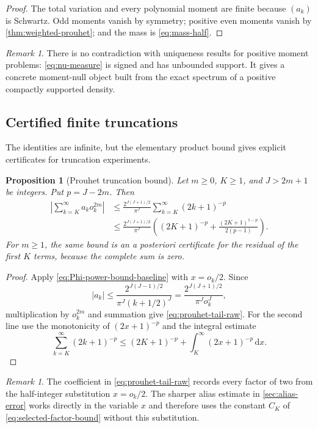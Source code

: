 \documentclass[11pt,oneside]{article}
\newtheorem{proposition}[theorem]{Proposition}
\theoremstyle{definition}
\theoremstyle{remark}
\newtheorem{remark}[theorem]{Remark}
\newcommand{\dd}{\,\mathrm d}
\begin{document}
\begin{proof}
The total variation and every polynomial moment are finite because $(a_k)$ is
Schwartz.  Odd moments vanish by symmetry; positive even moments vanish by
\cref{thm:weighted-prouhet}; and the mass is \eqref{eq:mass-half}.
\end{proof}

\begin{remark}
There is no contradiction with uniqueness results for positive moment problems:
\eqref{eq:nu-measure} is signed and has unbounded support.  It gives a concrete
moment-null object built from the exact spectrum of a positive compactly
supported density.
\end{remark}

\subsection{Certified finite truncations}

The identities are infinite, but the elementary product bound gives explicit
certificates for truncation experiments.

\begin{proposition}[Prouhet truncation bound]\label{prop:prouhet-tail}
Let $m\ge0$, $K\ge1$, and $J>2m+1$ be integers.  Put $p=J-2m$.  Then
\begin{align}
 \left|\sum_{k=K}^{\infty}a_ko_k^{2m}\right|
 &\le \frac{2^{J(J+1)/2}}{\pi^J}
 \sum_{k=K}^{\infty}(2k+1)^{-p}
 \label{eq:prouhet-tail-raw}\\
 &\le \frac{2^{J(J+1)/2}}{\pi^J}
 \left((2K+1)^{-p}
 +\frac{(2K+1)^{1-p}}{2(p-1)}\right).
 \label{eq:prouhet-tail-explicit}
\end{align}
For $m\ge1$, the same bound is an a posteriori certificate for the residual of
the first $K$ terms, because the complete sum is zero.
\end{proposition}

\begin{proof}
Apply \eqref{eq:Phi-power-bound-baseline} with $x=o_k/2$.  Since
\[
 |a_k|\le
 \frac{2^{J(J-1)/2}}{\pi^J(k+1/2)^J}
 =\frac{2^{J(J+1)/2}}{\pi^Jo_k^J},
\]
multiplication by $o_k^{2m}$ and summation give
\eqref{eq:prouhet-tail-raw}.  For the second line use the monotonicity of
$(2x+1)^{-p}$ and the integral estimate
\[
 \sum_{k=K}^{\infty}(2k+1)^{-p}
 \le (2K+1)^{-p}+\int_K^\infty(2x+1)^{-p}\dd x.
\]
\end{proof}

\begin{remark}
The coefficient in \eqref{eq:prouhet-tail-raw} records every factor of two from
the half-integer substitution $x=o_k/2$.  The sharper alias estimate in
\cref{sec:alias-error} works directly in the variable $x$ and therefore uses the
constant $C_K$ of \eqref{eq:selected-factor-bound} without this substitution.
\end{remark}
\end{document}
